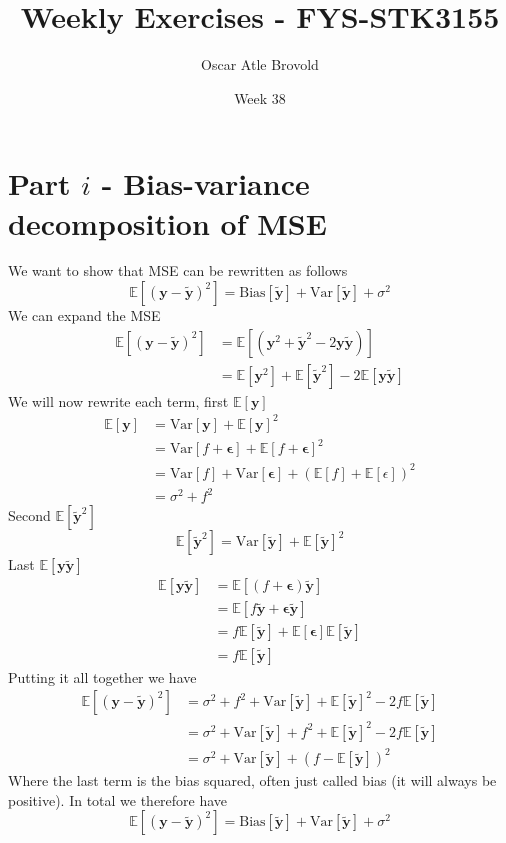 \documentclass{article}
\title{Weekly Exercises - FYS-STK3155}
\author{Oscar Atle Brovold}
\date{Week 38}
\newcommand{\EE}{\mathbb{E}}
\newcommand{\bb}[1]{\boldsymbol{#1}}
\newcommand{\ty}{\tilde{\bb{y}}}
\begin{document}
\onehalfspacing
\maketitle

\section*{Part \(i\) - Bias-variance decomposition of MSE}
We want to show that MSE can be rewritten as follows 
$$\EE[(\bb{y} - \tilde{\bb{y}})^{2}] = \text{Bias}[\tilde{\bb{y}}] + \text{Var}[\tilde{\bb{y}}] + \sigma^{2}$$
We can expand the MSE  
\begin{align*}
    \EE[(\bb{y} - \tilde{\bb{y}})^{2}] &= \EE[(\bb{y}^{2} + \tilde{\bb{y}}^{2} - 2\bb{y}\tilde{\bb{y}})] \\ 
    &= \EE[\bb{y}^{2}] + \EE[\ty^{2}] - 2\EE[\bb{y}\ty]
\end{align*}
We will now rewrite each term, first $\EE[\bb{y}]$
\begin{align*}
    \EE[\bb{y}] &= \text{Var}[\bb{y}] + \EE[\bb{y}]^{2} \\
    &= \text{Var}[f + \bb{\epsilon}] + \EE[f + \bb{\epsilon}]^{2} \\
    &= \text{Var}[f]+ \text{Var}[\bb{\epsilon}] + (\EE[f] + \EE[\epsilon])^{2} \\
    &= \sigma^{2}+ f^{2}
\end{align*}
Second $\EE[\ty^{2}]$
$$\EE[\ty^{2}] = \text{Var}[\ty] + \EE[\ty]^{2}$$
Last $\EE[\bb{y}\ty]$ 
\begin{align*}
    \EE[\bb{y}\ty] &= \EE[(f + \bb{\epsilon})\ty] \\
    &= \EE[f\ty + \bb{\epsilon}\ty] \\
    &= f\EE[\ty] + \EE[{\bb{\epsilon}}]\EE[\ty] \\
    &= f\EE[\ty]
\end{align*}
Putting it all together we have
\begin{align*}
    \EE[(\bb{y} - \tilde{\bb{y}})^{2}] &= \sigma^{2}+f^{2}+\text{Var}[\ty] + \EE[\ty]^{2} - 2f\EE[\ty] \\
    &= \sigma^{2} + \text{Var}[\ty] + f^{2} + \EE[\ty]^{2} - 2f\EE[\ty] \\
    &= \sigma^{2} + \text{Var}[\ty] + (f - \EE[\ty])^{2}
\end{align*}
Where the last term is the bias squared, often just called bias (it will always be positive). In total we therefore have
$$\EE[(\bb{y} - \tilde{\bb{y}})^{2}] = \text{Bias}[\tilde{\bb{y}}] + \text{Var}[\tilde{\bb{y}}] + \sigma^{2}$$
\end{document}
